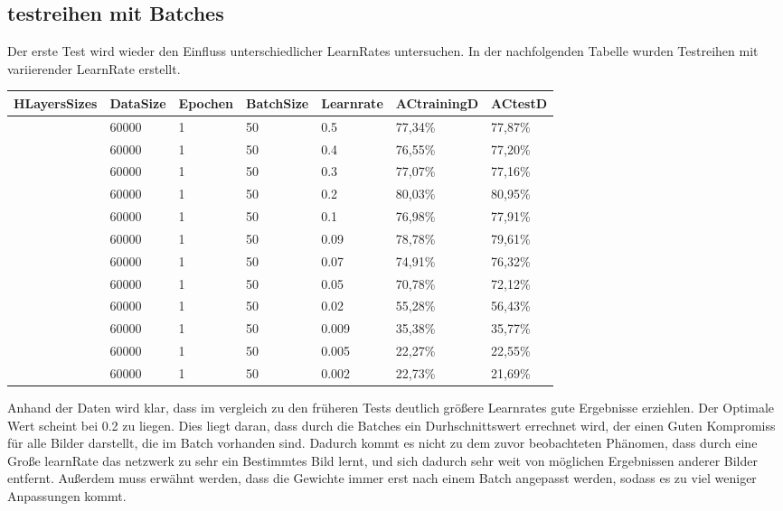 \documentclass[12pt]{article}
\begin{document}
\subsection{testreihen mit Batches}
Der erste Test wird wieder den Einfluss unterschiedlicher LearnRates untersuchen.
In der nachfolgenden Tabelle wurden Testreihen mit variierender LearnRate erstellt. 
\begin{table}[H]
    \centering
    \begin{tabular}{|l|l|l|l|l|l|l|}
    \hline
        HLayersSizes & DataSize & Epochen & BatchSize & Learnrate & ACtrainingD & ACtestD \\ \hline
        [784, 100, 10] & 60000 & 1 & 50 & 0.5 & 77,34\% & 77,87\% \\ \hline
        [784, 100, 10] & 60000 & 1 & 50 & 0.4 & 76,55\% & 77,20\% \\ \hline
        [784, 100, 10] & 60000 & 1 & 50 & 0.3 & 77,07\% & 77,16\% \\ \hline
        [784, 100, 10] & 60000 & 1 & 50 & 0.2 & 80,03\% & 80,95\% \\ \hline
        [784, 100, 10] & 60000 & 1 & 50 & 0.1 & 76,98\% & 77,91\% \\ \hline
        [784, 100, 10] & 60000 & 1 & 50 & 0.09 & 78,78\% & 79,61\% \\ \hline
        [784, 100, 10] & 60000 & 1 & 50 & 0.07 & 74,91\% & 76,32\% \\ \hline
        [784, 100, 10] & 60000 & 1 & 50 & 0.05 & 70,78\% & 72,12\% \\ \hline
        [784, 100, 10] & 60000 & 1 & 50 & 0.02 & 55,28\% & 56,43\% \\ \hline
        [784, 100, 10] & 60000 & 1 & 50 & 0.009 & 35,38\% & 35,77\% \\ \hline
        [784, 100, 10] & 60000 & 1 & 50 & 0.005 & 22,27\% & 22,55\% \\ \hline
        [784, 100, 10] & 60000 & 1 & 50 & 0.002 & 22,73\% & 21,69\% \\ \hline
    \end{tabular}
\end{table}
Anhand der Daten wird klar, dass im vergleich zu den früheren Tests deutlich größere Learnrates gute Ergebnisse erziehlen. Der Optimale Wert scheint bei 0.2 zu liegen. Dies liegt daran, dass durch die Batches ein Durhschnittswert errechnet wird, der einen Guten Kompromiss für alle Bilder darstellt, die im Batch vorhanden sind. Dadurch kommt es nicht zu dem zuvor beobachteten Phänomen, dass durch eine Große learnRate das netzwerk zu sehr ein Bestimmtes Bild lernt, und sich dadurch sehr weit von möglichen Ergebnissen anderer Bilder entfernt. Außerdem muss erwähnt werden, dass die Gewichte immer erst nach einem Batch angepasst werden, sodass es zu viel weniger Anpassungen kommt. 
\end{document}
